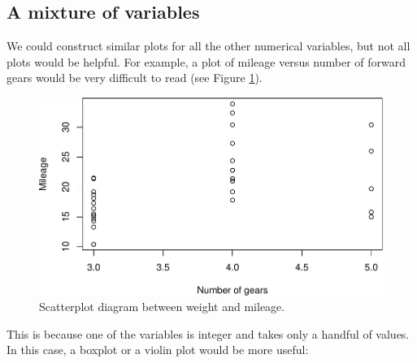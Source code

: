 \documentclass[
]{book}
\newenvironment{Shaded}{\begin{snugshade}}{\end{snugshade}}
\newcommand{\AttributeTok}[1]{\textcolor[rgb]{0.13,0.29,0.53}{#1}}
\newcommand{\DecValTok}[1]{\textcolor[rgb]{0.00,0.00,0.81}{#1}}
\newcommand{\FunctionTok}[1]{\textcolor[rgb]{0.13,0.29,0.53}{\textbf{#1}}}
\newcommand{\NormalTok}[1]{#1}
\newcommand{\SpecialCharTok}[1]{\textcolor[rgb]{0.81,0.36,0.00}{\textbf{#1}}}
\newcommand{\StringTok}[1]{\textcolor[rgb]{0.31,0.60,0.02}{#1}}
\theoremstyle{definition}
\theoremstyle{definition}
\theoremstyle{definition}
\theoremstyle{definition}
\theoremstyle{remark}
\begin{document}
\subsection{A mixture of variables}\label{a-mixture-of-variables}

We could construct similar plots for all the other numerical variables, but not all plots would be helpful. For example, a plot of mileage versus number of forward gears would be very difficult to read (see Figure \ref{fig:scatterGearMPG}).

\begin{Shaded}
\end{Shaded}

\begin{figure}
\centering
\includegraphics{Svetunkov---Statistics-for-Business-Analytics_files/figure-latex/scatterGearMPG-1.pdf}
\caption{\label{fig:scatterGearMPG}Scatterplot diagram between weight and mileage.}
\end{figure}

This is because one of the variables is integer and takes only a handful of values. In this case, a boxplot or a violin plot would be more useful:

\begin{Shaded}
\end{Shaded}
\end{document}
